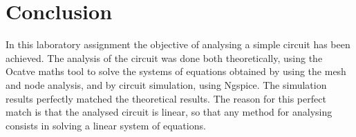 \section{Conclusion}
\label{sec:conclusion}

In this laboratory assignment the objective of analysing a simple circuit has been
achieved. The analysis of the circuit was done both theoretically, using  the Ocatve maths tool
 to solve the systems of equations obtained by using the mesh and node analysis, and by circuit
  simulation, using Ngspice. The simulation results perfectly matched the theoretical results.
   The reason for this perfect match is that the analysed circuit is linear, so that any method 
   for analysing consists in solving a linear system of equations.

